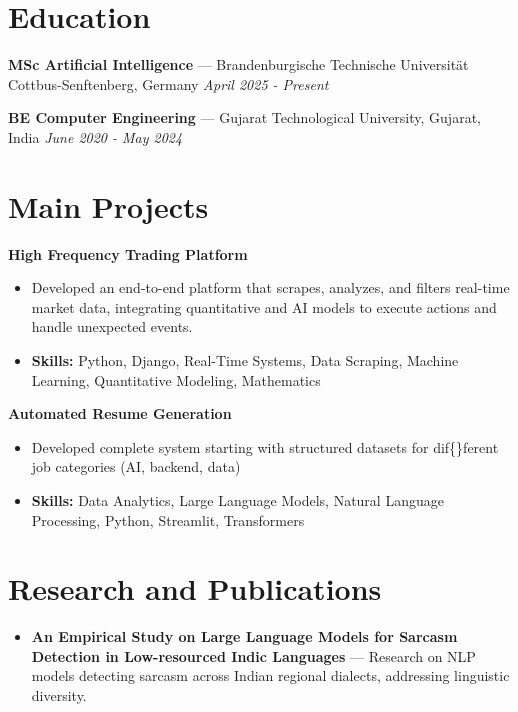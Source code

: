 \documentclass[a4paper,10pt]{article}
\begin{document}
\section*{Education}
\textbf{MSc Artificial Intelligence} — Brandenburgische Technische Universität Cottbus-Senftenberg, Germany \hfill \textit{April 2025 - Present}\par
\vspace{1.5pt}
\textbf{BE Computer Engineering} — Gujarat Technological University, Gujarat, India \hfill \textit{June 2020 - May 2024}\par

\section*{Main Projects}
\textbf{High Frequency Trading Platform}\par
\vspace{1pt}
\begin{itemize}
  \item Developed an end-to-end platform that scrapes, analyzes, and filters real-time market data, integrating quantitative and AI models to execute actions and handle unexpected events.
  \item \textbf{Skills:} Python, Django, Real-Time Systems, Data Scraping, Machine Learning, Quantitative Modeling, Mathematics
\end{itemize}
\vspace{3pt}
\textbf{Automated Resume Generation}\par
\vspace{1pt}
\begin{itemize}
  \item Developed complete system starting with structured datasets for dif\{\}ferent job categories (AI, backend, data)
  \item \textbf{Skills:} Data Analytics, Large Language Models, Natural Language Processing, Python, Streamlit, Transformers
\end{itemize}

\section*{Research and Publications}
\begin{itemize}
\item \textbf{An Empirical Study on Large Language Models for Sarcasm Detection in Low-resourced Indic Languages} — Research on NLP models detecting sarcasm across Indian regional dialects, addressing linguistic diversity.
\end{itemize}
\end{document}
